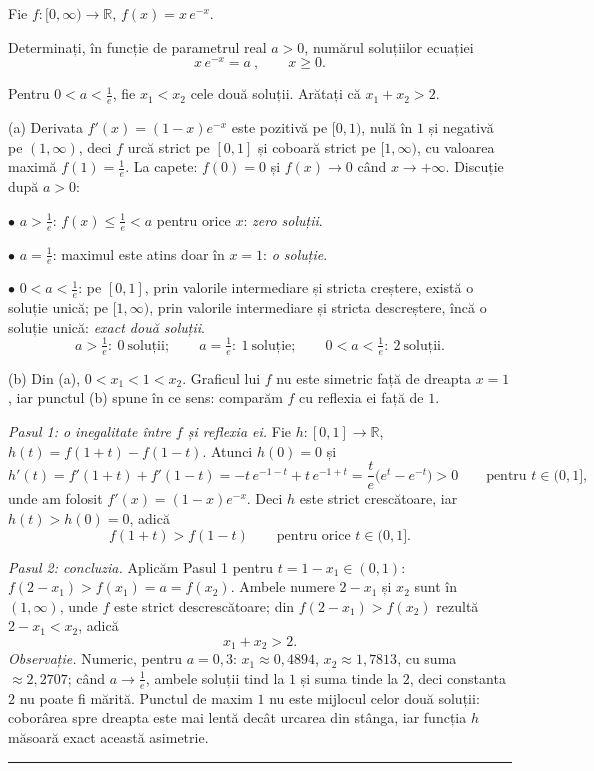 Fie $f:[0,\infty)\to\mathbb{R}$, $f(x)=x\,e^{-x}$.
\begin{parti}
  \item Determinați, în funcție de parametrul real $a>0$, numărul soluțiilor ecuației
  \[ x\,e^{-x}=a\ ,\qquad x\ge0 . \]
  \item Pentru $0<a<\frac1e$, fie $x_1<x_2$ cele două soluții. Arătați că $x_1+x_2>2$.
\end{parti}
\sol (a) Derivata $f'(x)=(1-x)e^{-x}$ este pozitivă pe $[0,1)$, nulă în $1$ și negativă pe $(1,\infty)$, deci $f$ urcă strict pe $[0,1]$ și coboară strict pe $[1,\infty)$, cu valoarea maximă $f(1)=\frac1e$. La capete: $f(0)=0$ și $f(x)\to0$ când $x\to+\infty$. Discuție după $a>0$:

$\bullet$ $a>\frac1e$: $f(x)\le\frac1e<a$ pentru orice $x$: \emph{zero soluții}.

$\bullet$ $a=\frac1e$: maximul este atins doar în $x=1$: \emph{o soluție}.

$\bullet$ $0<a<\frac1e$: pe $[0,1]$, prin valorile intermediare și stricta creștere, există o soluție unică; pe $[1,\infty)$, prin valorile intermediare și stricta descreștere, încă o soluție unică: \emph{exact două soluții}.
\[ \boxed{\ a>\tfrac1e:\ 0\ \text{soluții};\qquad a=\tfrac1e:\ 1\ \text{soluție};\qquad 0<a<\tfrac1e:\ 2\ \text{soluții}.\ } \]

(b) Din (a), $0<x_1<1<x_2$. Graficul lui $f$ nu este simetric față de dreapta $x=1$, iar punctul (b) spune în ce sens: comparăm $f$ cu reflexia ei față de $1$.

\emph{Pasul 1: o inegalitate între $f$ și reflexia ei.} Fie $h:[0,1]\to\mathbb{R}$, $h(t)=f(1+t)-f(1-t)$. Atunci $h(0)=0$ și
\[ h'(t)=f'(1+t)+f'(1-t)=-t\,e^{-1-t}+t\,e^{-1+t}=\frac{t}{e}\bigl(e^{t}-e^{-t}\bigr)>0\qquad\text{pentru }t\in(0,1] , \]
unde am folosit $f'(x)=(1-x)e^{-x}$. Deci $h$ este strict crescătoare, iar $h(t)>h(0)=0$, adică
\[ f(1+t)>f(1-t)\qquad\text{pentru orice }t\in(0,1] . \]

\emph{Pasul 2: concluzia.} Aplicăm Pasul 1 pentru $t=1-x_1\in(0,1)$: $f(2-x_1)>f(x_1)=a=f(x_2)$. Ambele numere $2-x_1$ și $x_2$ sunt în $(1,\infty)$, unde $f$ este strict descrescătoare; din $f(2-x_1)>f(x_2)$ rezultă $2-x_1<x_2$, adică
\[ x_1+x_2>2 . \]
\emph{Observație.} Numeric, pentru $a=0{,}3$: $x_1\approx0{,}4894$, $x_2\approx1{,}7813$, cu suma $\approx2{,}2707$; când $a\to\frac1e$, ambele soluții tind la $1$ și suma tinde la $2$, deci constanta $2$ nu poate fi mărită. Punctul de maxim $1$ nu este mijlocul celor două soluții: coborârea spre dreapta este mai lentă decât urcarea din stânga, iar funcția $h$ măsoară exact această asimetrie.
\vspace{1mm}\hrule

